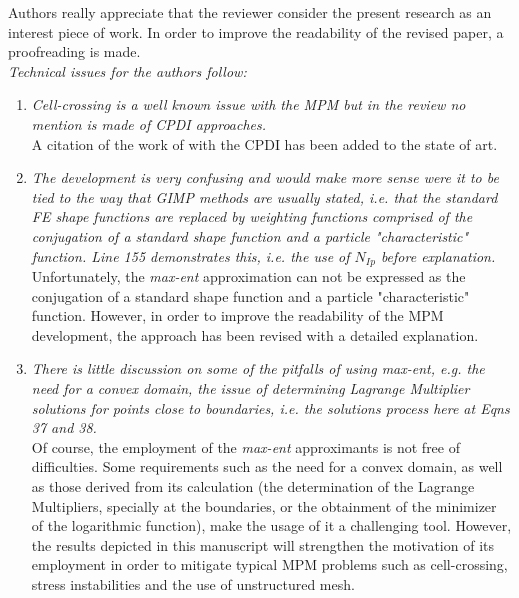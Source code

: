 \documentclass[12pt]{article}
\begin{document}
Authors really appreciate that the reviewer consider the present research as an interest piece of work. In order to improve the readability of the revised paper, a proofreading is made.\\

\textit{Technical issues for the authors follow:}
 \begin{enumerate}
\item \textit{Cell-crossing is a well known issue with the MPM but in the review no mention is made of CPDI approaches.}\\

A citation of the work of \cite{Sadeghirad_2011} with the CPDI has been added to the state of art.

\item \textit{The development is very confusing and would make more sense were it to be tied to 
the way that GIMP methods are usually stated, i.e. that the standard FE shape functions are replaced by weighting functions comprised of the conjugation of a standard shape function and a particle "characteristic" function. Line 155 demonstrates this, i.e. the use of $N_{Ip}$ before explanation.}\\

Unfortunately, the \textit{max-ent} approximation can not be expressed as the conjugation of a standard shape function and a particle "characteristic" function. However, in order to improve the readability of the MPM development, the approach has been revised with a detailed explanation.

\item \textit{There is little discussion on some of the pitfalls of using max-ent, e.g. the need for a convex domain, the issue of determining Lagrange Multiplier solutions for points close to boundaries, i.e. the solutions process here at Eqns 37 and 38.}\\

Of course, the employment of the \textit{max-ent} approximants is not free of difficulties. Some requirements such as the need for a convex domain, as well as those derived from its calculation (the determination of the Lagrange Multipliers, specially at the boundaries, or the obtainment of the minimizer of the logarithmic function), make the usage of it a challenging tool. However, the results depicted in this manuscript will strengthen the motivation of its employment in order to mitigate typical MPM problems such as cell-crossing, stress instabilities and the use of unstructured mesh.  


\end{enumerate}
\end{document}
